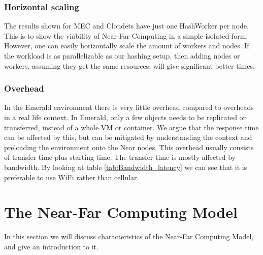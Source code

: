 \subsubsection{Horizontal scaling}
The results shown for MEC and Cloudets have just one HashWorker per node. This is to show the viability of Near-Far Computing in a simple isolated form. However, one can easily horizontally scale the amount of workers and nodes. If the workload is as parallelizable as our hashing setup, then adding nodes or workers, assuming they get the same resources, will give significant better times.

\subsubsection{Overhead}
In the Emerald environment there is very little overhead compared to overheads in a real life context. In Emerald, only a few objects needs to be replicated or transferred, instead of a whole VM or container. We argue that the response time can be affected by this, but can be mitigated by understanding the context and preloading the environment onto the Near nodes. This overhead usually consists of transfer time plus starting time. The transfer time is mostly affected by bandwidth. By looking at table \ref{tab:Bandwidth_latency} we can see that it is preferable to use WiFi rather than cellular. 








\section{The Near-Far Computing Model}
In this section we will discuss characteristics of the Near-Far Computing Model, and give an introduction to it. 


